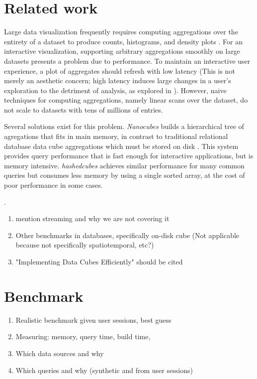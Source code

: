 \documentclass[journal]{vgtc}                %
\begin{document}
\section{Related work}
Large data visualization frequently requires computing aggregations over the
entirety of a dataset to produce counts, histograms, and density plots
\cite{?}. For an interactive visualization, supporting arbitrary aggregations
smoothly on large datasets presents a problem due to performance. To maintain
an interactive user experience, a plot of aggregates should refresh with low
latency (This is not merely an aesthetic concern; high latency induces large
changes in a user's exploration to the detriment of analysis, as explored in
\cite{2014-latency} ). However, naive techniques
for computing aggregations, namely linear scans over the dataset, do not scale
to datasets with tens of millions of entries.

Several solutions exist for this problem. \textit{Nanocubes} builds a
hierarchical tree of agregations that fits in main memory, in contrast to
traditional relational database data cube aggregations which must be stored on
disk \cite{nanocubes}. This system provides query performance that is fast
enough for interactive applications, but is memory intensive.
\textit{hashedcubes} achieves similar performance for many common queries but
consumes less memory by using a single sorted array, at the cost of poor
performance in some cases.

. 

\begin{enumerate}
	\item mention streaming and why we are not covering it
	\item Other benchmarks in databases, specifically on-disk cube (Not applicable because not specifically spatiotemporal, etc?)
	\item "Implementing Data Cubes Efficiently" should be cited
\end{enumerate}

\section{Benchmark}
\begin{enumerate}
	\item Realistic benchmark given user sessions, best guess
	\item Measuring: memory, query time, build time, 
	\item Which data sources and why
	\item Which queries and why (synthetic and from user sessions)
\end{enumerate}
\end{document}
